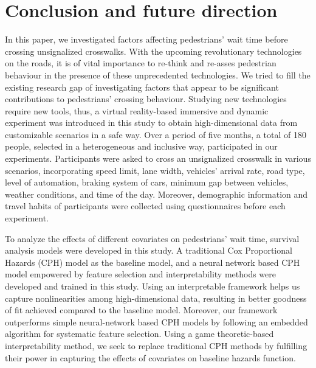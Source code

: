 \section{Conclusion and future direction}
\label{S:Con}
In this paper, we investigated factors affecting pedestrians' wait time before crossing unsignalized crosswalks. With the upcoming revolutionary technologies on the roads, it is of vital importance to re-think and re-asses pedestrian behaviour in the presence of these unprecedented technologies. We tried to fill the existing research gap of investigating factors that appear to be significant contributions to pedestrians' crossing behaviour. Studying new technologies require new tools, thus, a virtual reality-based immersive and dynamic experiment was introduced in this study to obtain high-dimensional data from customizable scenarios in a safe way. Over a period of five months, a total of 180 people, selected in a heterogeneous and inclusive way, participated in our experiments. Participants were asked to cross an unsignalized crosswalk in various scenarios, incorporating speed limit, lane width, vehicles' arrival rate, road type, level of automation, braking system of cars, minimum gap between vehicles, weather conditions, and time of the day. Moreover, demographic information and travel habits of participants were collected using questionnaires before each experiment.

To analyze the effects of different covariates on pedestrians' wait time, survival analysis models were developed in this study. A traditional Cox Proportional Hazards (CPH) model as the baseline model, and a neural network based CPH model empowered by feature selection and interpretability methods were developed and trained in this study. Using an interpretable framework helps us capture nonlinearities among high-dimensional data, resulting in better goodness of fit achieved compared to the baseline model. Moreover, our framework outperforms simple neural-network based CPH models by following an embedded algorithm for systematic feature selection. Using a game theoretic-based interpretability method, we seek to replace traditional CPH methods by fulfilling their power in capturing the effects of covariates on baseline hazards function.

